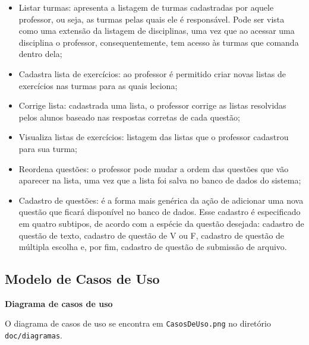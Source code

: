 \documentclass[12pt,letterpaper]{article}
\begin{document}
\begin{itemize}
\item{}Listar turmas: apresenta a listagem de turmas cadastradas por aquele professor, ou seja, as turmas pelas quais ele é responsável. Pode ser vista como uma extensão da listagem de disciplinas, uma vez que ao acessar uma disciplina o professor, consequentemente, tem acesso às turmas que comanda dentro dela;
\item{}Cadastra lista de exercícios: ao professor é permitido criar novas listas de exercícios nas turmas para as quais leciona;
\item{}Corrige lista: cadastrada uma lista, o professor corrige as listas resolvidas pelos alunos baseado nas respostas corretas de cada questão;
\item{}Visualiza listas de exercícios: listagem das listas que o professor cadastrou para sua turma;
\item{}Reordena questões: o professor pode mudar a ordem das questões que vão aparecer na lista, uma vez que a lista foi salva no banco de dados do sistema;
\item{}Cadastro de questões: é a forma mais genérica da ação de adicionar uma nova questão que ficará disponível no banco de dados. Esse cadastro é especificado em quatro subtipos, de acordo com a espécie da questão desejada: cadastro de questão de texto, cadastro de questão de V ou F, cadastro de questão de múltipla escolha e, por fim, cadastro de questão de submissão de arquivo.
\end{itemize}

\pagebreak

\subsection{Modelo de Casos de Uso}



\vspace{1cm}
{\large {\bf Diagrama de casos de uso}}
\vspace{0.5cm}

O diagrama de casos de uso se encontra em \texttt{CasosDeUso.png} no diretório \texttt{doc/diagramas}.


\end{document}

